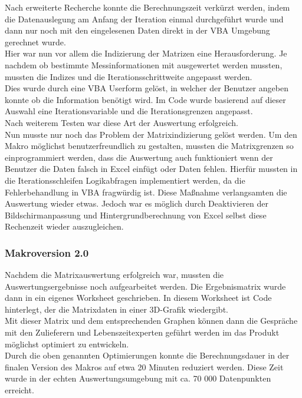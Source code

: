 Nach erweiterte Recherche konnte die Berechnungszeit verkürzt werden, indem die Datenauslegung am Anfang der Iteration einmal durchgeführt wurde und dann nur noch mit den eingelesenen Daten direkt in der VBA Umgebung gerechnet wurde. \\
Hier war nun vor allem die Indizierung der Matrizen eine Herausforderung. Je nachdem ob bestimmte Messinformationen mit ausgewertet werden mussten, mussten die Indizes und die Iterationsschrittweite angepasst werden. \\
Dies wurde durch eine VBA Userform gelöst, in welcher der Benutzer angeben konnte ob die Information benötigt wird. Im Code wurde basierend auf dieser Auswahl eine Iterationsvariable und die Iterationsgrenzen angepasst. \\
Nach weiterem Testen war diese Art der Auswertung erfolgreich. \\

Nun musste nur noch das Problem der Matrixindizierung gelöst werden. Um den Makro möglichst benutzerfreundlich zu gestalten, mussten die Matrixgrenzen so einprogrammiert werden, dass die Auswertung auch funktioniert wenn der Benutzer die Daten falsch in Excel einfügt oder Daten fehlen. Hierfür mussten in die Iterationsschleifen Logikabfragen implementiert werden, da die Fehlerbehandlung in VBA fragwürdig ist. Diese Maßnahme verlangsamten die Auswertung wieder etwas. Jedoch war es möglich durch Deaktivieren der Bildschirmanpassung und Hintergrundberechnung von Excel selbst diese Rechenzeit wieder auszugleichen. \\

\subsubsection{Makroversion 2.0}
\label{Makro2.0}

Nachdem die Matrixauswertung erfolgreich war, mussten die Auswertungsergebnisse noch aufgearbeitet werden. Die Ergebnismatrix wurde dann in ein eigenes Worksheet geschrieben. In diesem Worksheet ist Code hinterlegt, der die Matrixdaten in einer 3D-Grafik wiedergibt. \\
Mit dieser Matrix und dem entsprechenden Graphen können dann die Gespräche mit den Zulieferern und Lebenszeitexperten geführt werden im das Produkt möglichst optimiert zu entwickeln.\\

Durch die oben genannten Optimierungen konnte die Berechnungsdauer in der finalen Version des Makros auf etwa 20 Minuten reduziert werden. Diese Zeit wurde in der echten Auswertungsumgebung mit ca. 70 000 Datenpunkten erreicht.\\

